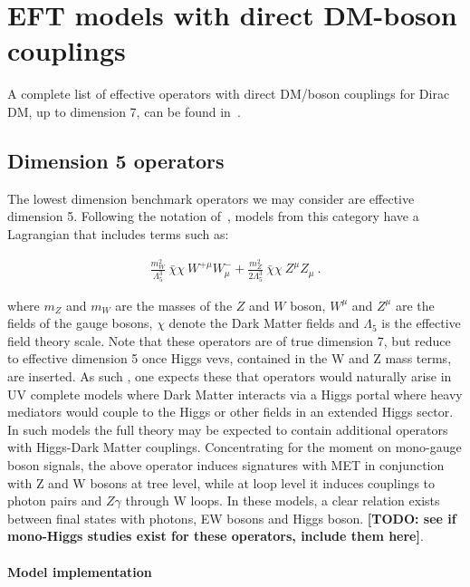 \section{EFT models with direct DM-boson couplings}

A complete list of effective operators with direct DM/boson couplings for
Dirac DM, up to dimension 7, can be found in~\cite{Cotta:2012nj}.

\subsection{Dimension 5 operators}

The lowest dimension benchmark operators we may consider are effective dimension 5.  
Following the notation of~\cite{Carpenter:2012rg},  models
from this category have a Lagrangian that includes terms such as:

\begin{eqnarray}
\frac{m_W^2}{\Lambda_5^3} ~\bar{\chi} \chi ~W^{+ \mu} W^{-}_\mu
+ \frac{m_Z^2}{2 \Lambda_5^3} ~ \bar{\chi} \chi ~ Z^\mu Z_\mu ~.
\end{eqnarray}

where $m_Z$ and $m_W$ are the masses of the $Z$ and $W$ boson, $W^{\mu}$ and $Z^{\mu}$
are the fields of the gauge bosons, $\chi$ denote the Dark Matter fields
and $\Lambda_5$ is the effective field theory scale.  Note that these operators are of true dimension 7, 
but reduce to effective dimension 5 once Higgs vevs, contained in the W and Z mass terms, are inserted.  
As such , one expects  these that operators would naturally  arise in UV complete models where Dark Matter 
interacts via a Higgs portal where heavy mediators would couple to the Higgs or other fields in an extended Higgs sector. 
In such models the full theory may be expected to contain additional operators with Higgs-Dark Matter couplings. 
Concentrating  for the moment on mono-gauge boson signals, the above operator induces signatures with 
MET in conjunction with Z and W bosons at tree level,
while at loop level it induces couplings to photon pairs and $Z \gamma$ through W loops.
In these models, a clear relation exists between final states with photons, EW bosons
and Higgs boson. \textbf{[TODO: see if mono-Higgs studies exist for these operators, include them here]}.

\paragraph{Model implementation}

